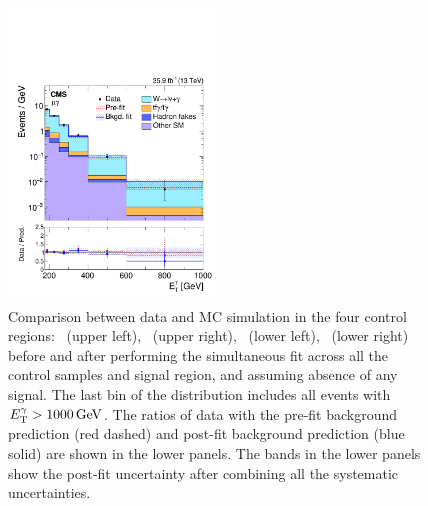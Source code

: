 \begin{figure}[htbp]
    \includegraphics[width=0.49\textwidth]{Analysis/Figures/bonly_monomu.pdf}
    \caption{
      Comparison between data and MC simulation in the four control regions: 
      \Pe\Pe\Pgg\ (upper left), 
      \Pgm\Pgm\Pgg\ (upper right), 
      \Pe\Pgg\ (lower left), 
      \Pgm\Pgg\ (lower right) 
      before and after performing the simultaneous fit across all the control samples and signal region, and assuming absence of any signal.
      The last bin of the distribution includes all events with $E_{\mathrm{T}}^{\gamma} > 1000\,\text{Ge\hspace{-.08em}V}$. 
      The ratios of data with the pre-fit background prediction (red dashed) and post-fit background prediction (blue solid) are shown in the lower panels. 
      The bands in the lower panels show the post-fit uncertainty after combining all the systematic uncertainties.
}
    \label{fig:postfitCR}
\end{figure}

